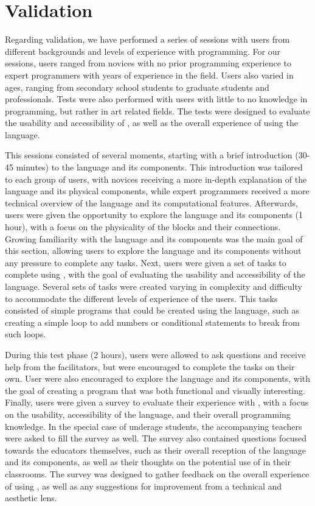 \section{Validation}
\label{sec:methodology:validation}

Regarding validation, we have performed a series of sessions with users from different backgrounds and levels of experience with programming.
For our sessions, users ranged from novices with no prior programming experience to expert programmers with years of experience in the field.
Users also varied in ages, ranging from secondary school students to graduate students and professionals.
Tests were also performed with users with little to no knowledge in programming, but rather in art related fields.
The tests were designed to evaluate the usability and accessibility of \sculpt, as well as the overall experience of using the language.

This sessions consisted of several moments, starting with a brief introduction (30-45 minutes) to the language and its components.
This introduction was tailored to each group of users, with novices receiving a more in-depth explanation of the language and its physical components, while expert programmers received a more technical overview of the language and its computational features.
Afterwards, users were given the opportunity to explore the language and its components (1 hour), with a focus on the physicality of the blocks and their connections. Growing familiarity with the language and its components was the main goal of this section, allowing users to explore the language and its components without any pressure to complete any tasks.
Next, users were given a set of tasks to complete using \sculpt, with the goal of evaluating the usability and accessibility of the language.
Several sets of tasks were created varying in complexity and difficulty to accommodate the different levels of experience of the users.
This tasks consisted of simple programs that could be created using the language, such as creating a simple loop to add numbers or conditional statements to break from such loops.

During this test phase (2 hours), users were allowed to ask questions and receive help from the facilitators, but were encouraged to complete the tasks on their own.
User were also encouraged to explore the language and its components, with the goal of creating a program that was both functional and visually interesting.
Finally, users were given a survey to evaluate their experience with \sculpt, with a focus on the usability, accessibility of the language, and their overall programming knowledge.
In the special case of underage students, the accompanying teachers were asked to fill the survey as well.
The survey also contained questions focused towards the educators themselves, such as their overall reception of the language and its components, as well as their thoughts on the potential use of \sculpt in their classrooms.
The survey was designed to gather feedback on the overall experience of using \sculpt, as well as any suggestions for improvement from a technical and aesthetic lens.

